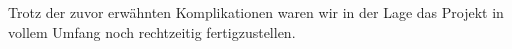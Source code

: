 Trotz der zuvor erwähnten Komplikationen waren wir in der Lage das Projekt in vollem Umfang noch rechtzeitig fertigzustellen.